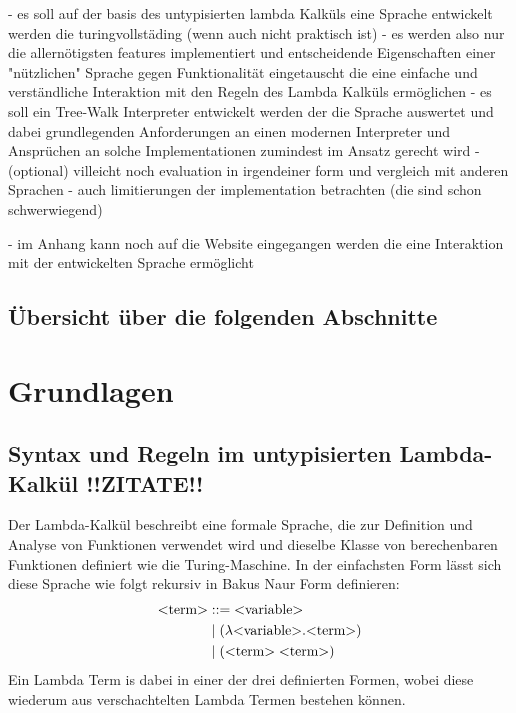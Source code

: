 \documentclass[ngerman]{article}
\begin{document}
- es soll auf der basis des untypisierten lambda Kalküls eine Sprache entwickelt werden die turingvollstäding (wenn auch nicht praktisch ist)
    - es werden also nur die allernötigsten features implementiert und entscheidende Eigenschaften einer "nützlichen" Sprache gegen Funktionalität eingetauscht die eine einfache und verständliche Interaktion mit den Regeln des Lambda Kalküls ermöglichen
- es soll ein Tree-Walk Interpreter entwickelt werden der die Sprache auswertet und dabei grundlegenden Anforderungen an einen modernen Interpreter und Ansprüchen an solche Implementationen zumindest im Ansatz gerecht wird 
- (optional) villeicht noch evaluation in irgendeiner form und vergleich mit anderen Sprachen 
- auch limitierungen der implementation betrachten (die sind schon schwerwiegend)

- im Anhang kann noch auf die Website eingegangen werden die eine Interaktion mit der entwickelten Sprache ermöglicht

\subsection{Übersicht über die folgenden Abschnitte}

\section{Grundlagen}

\subsection{Syntax und Regeln im untypisierten Lambda-Kalkül !!ZITATE!!}

Der Lambda-Kalkül beschreibt eine formale Sprache, die zur Definition und Analyse von Funktionen verwendet wird und dieselbe Klasse von berechenbaren Funktionen definiert wie die Turing-Maschine.
In der einfachsten Form lässt sich diese Sprache wie folgt rekursiv in Bakus Naur Form definieren:
\begin{align*}
    \text{\textless term\textgreater} & ::= \text{\textless variable\textgreater} \\
                      & \; | \; ( \lambda \text{\textless variable\textgreater} . \text{\textless term\textgreater} )\\
                      & \; | \; (\text{\textless term\textgreater} \; \text{\textless term\textgreater})
\end{align*}
Ein Lambda Term is dabei in einer der drei definierten Formen, wobei diese wiederum aus verschachtelten Lambda Termen bestehen können.
\end{document}
